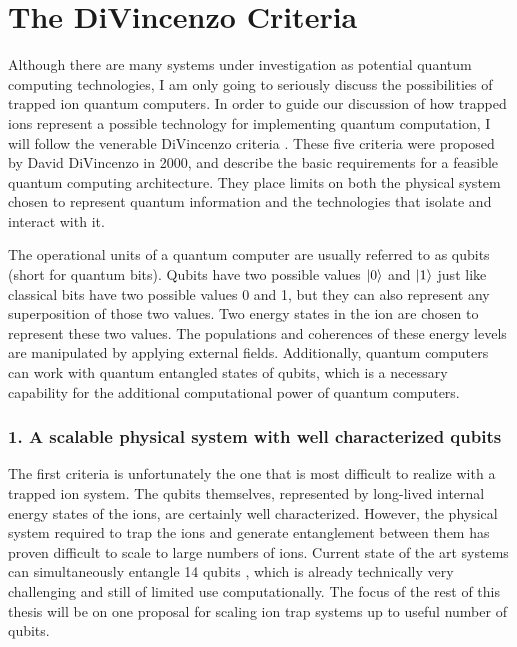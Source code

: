 \section{The DiVincenzo Criteria}
\label{sec:divincenzo}

Although there are many systems under investigation as potential quantum computing technologies, I am only going to seriously discuss the possibilities of trapped ion quantum computers.  In order to guide our discussion of how trapped ions represent a possible technology for implementing quantum computation, I will follow the venerable DiVincenzo criteria \cite{DiVincenzo:00}.  These five criteria were proposed by David DiVincenzo in 2000, and describe the basic requirements for a feasible quantum computing architecture.  They place limits on both the physical system chosen to represent quantum information and the technologies that isolate and interact with it.

The operational units of a quantum computer are usually referred to as qubits (short for quantum bits).  Qubits have two possible values $\left| 0 \right>$ and $\left| 1 \right>$ just like classical bits have two possible values 0 and 1, but they can also represent any superposition of those two values.  Two energy states in the ion are chosen to represent these two values.   The populations and coherences of these energy levels are manipulated by applying external fields.  Additionally, quantum computers can work with quantum entangled states of qubits, which is a necessary capability for the additional computational power of quantum computers.

\subsubsection{1. A scalable physical system with well characterized qubits}

The first criteria is unfortunately the one that is most difficult to realize with a trapped ion system.  The qubits themselves, represented by long-lived internal energy states of the ions, are certainly well characterized.  However, the physical system required to trap the ions and generate entanglement between them has proven difficult to scale to large numbers of ions.  Current state of the art systems can simultaneously entangle 14 qubits \cite{Monz:11}, which is already technically very challenging and still of limited use computationally.  The focus of the rest of this thesis will be on one proposal for scaling ion trap systems up to useful number of qubits.

